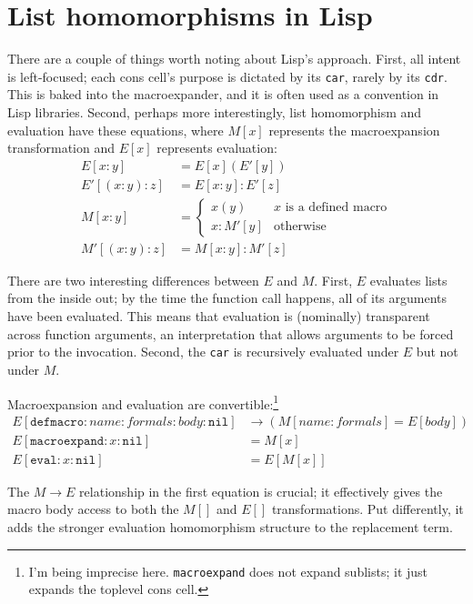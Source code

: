 \documentclass{report}
\begin{document}
\section{List homomorphisms in Lisp}
    There are a couple of things worth noting about Lisp's approach. First, all intent is left-focused; each cons cell's purpose is dictated by its {\tt car}, rarely by its {\tt cdr}. This is
    baked into the macroexpander, and it is often used as a convention in Lisp libraries. Second, perhaps more interestingly, list homomorphism and evaluation have these equations, where
    $M[x]$ represents the macroexpansion transformation and $E[x]$ represents evaluation:
\begin{align*}
E[x:y]      & = E[x](E'[y]) \\
E'[(x:y):z] & = E[x:y]:E'[z] \\
M[x:y]      & = \begin{cases}
                  x(y)    & \textrm{$x$ is a defined macro} \\
                  x:M'[y] & \textrm{otherwise}
                \end{cases} \\
M'[(x:y):z] & = M[x:y]:M'[z]
\end{align*}

    There are two interesting differences between $E$ and $M$. First, $E$ evaluates lists from the inside out; by the time the function call happens, all of its arguments have been evaluated.
    This means that evaluation is (nominally) transparent across function arguments, an interpretation that allows arguments to be forced prior to the invocation. Second, the {\tt car} is
    recursively evaluated under $E$ but not under $M$.

    Macroexpansion and evaluation are convertible:\footnote{I'm being imprecise here. {\tt macroexpand} does not expand sublists; it just expands the toplevel cons cell.}
\begin{align*}
E[\texttt{defmacro}:name:formals:body:\texttt{nil}] & \rightarrow (M[name:formals] = E[body]) \\
E[\texttt{macroexpand}:x:\texttt{nil}]              & = M[x] \\
E[\texttt{eval}:x:\texttt{nil}]                     & = E[M[x]]
\end{align*}

    The $M \rightarrow E$ relationship in the first equation is crucial; it effectively gives the macro body access to both the $M[]$ and $E[]$ transformations. Put differently, it adds the
    stronger evaluation homomorphism structure to the replacement term.
\end{document}
